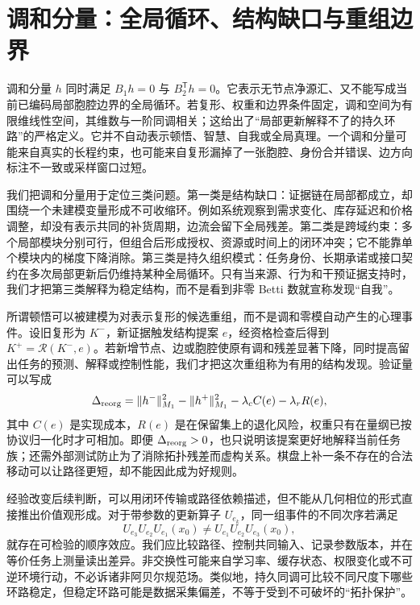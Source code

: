 \section{调和分量：全局循环、结构缺口与重组边界}
\label{sec:section_8979}

调和分量 $h$ 同时满足 $B_1h=0$ 与 $B_2^{\mathsf T}h=0$。它表示无节点净源汇、又不能写成当前已编码局部胞腔边界的全局循环。若复形、权重和边界条件固定，调和空间为有限维线性空间，其维数与一阶同调相关；这给出了“局部更新解释不了的持久环路”的严格定义。它并不自动表示顿悟、智慧、自我或全局真理。一个调和分量可能来自真实的长程约束，也可能来自复形漏掉了一张胞腔、身份合并错误、边方向标注不一致或采样窗口过短。

我们把调和分量用于定位三类问题。第一类是结构缺口：证据链在局部都成立，却围绕一个未建模变量形成不可收缩环。例如系统观察到需求变化、库存延迟和价格调整，却没有表示共同的补货周期，边流会留下全局残差。第二类是跨域约束：多个局部模块分别可行，但组合后形成授权、资源或时间上的闭环冲突；它不能靠单个模块内的梯度下降消除。第三类是持久组织模式：任务身份、长期承诺或接口契约在多次局部更新后仍维持某种全局循环。只有当来源、行为和干预证据支持时，我们才把第三类解释为稳定结构，而不是看到非零 Betti 数就宣称发现“自我”。

所谓顿悟可以被建模为对表示复形的候选重组，而不是调和零模自动产生的心理事件。设旧复形为 $K^{-}$，新证据触发结构提案 $e$，经资格检查后得到 $K^{+}=\mathcal{R}(K^{-},e)$。若新增节点、边或胞腔使原有调和残差显著下降，同时提高留出任务的预测、解释或控制性能，我们才把这次重组称为有用的结构发现。验证量可以写成
\begin{equation}
  \Delta_{\rm reorg}=\|h^{-}\|_{M_1}^{2}-\|h^{+}\|_{M_1}^{2}
  -\lambda_c C(e)-\lambda_r R(e),
  \label{eq:rheology_reorganization_score}
\end{equation}
其中 $C(e)$ 是实现成本，$R(e)$ 是在保留集上的退化风险，权重只有在量纲已按协议归一化时才可相加。即便 $\Delta_{\rm reorg}>0$，也只说明该提案更好地解释当前任务族；还需外部测试防止为了消除拓扑残差而虚构关系。棋盘上补一条不存在的合法移动可以让路径更短，却不能因此成为好规则。

经验改变后续判断，可以用闭环传输或路径依赖描述，但不能从几何相位的形式直接推出价值观形成。对于带参数的更新算子 $U_{e_k}$，同一组事件的不同次序若满足
\[
 U_{e_3}U_{e_2}U_{e_1}(x_0)\neq U_{e_1}U_{e_2}U_{e_3}(x_0),
\]
就存在可检验的顺序效应。我们应比较路径、控制共同输入、记录参数版本，并在等价任务上测量读出差异。非交换性可能来自学习率、缓存状态、权限变化或不可逆环境行动，不必诉诸非阿贝尔规范场。类似地，持久同调可比较不同尺度下哪些环路稳定，但稳定环路可能是数据采集偏差，不等于受到不可破坏的“拓扑保护”。

